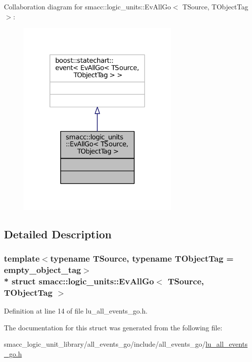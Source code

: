 Collaboration diagram for smacc\+:\+:logic\+\_\+units\+:\+:Ev\+All\+Go$<$ T\+Source, T\+Object\+Tag $>$\+:
\nopagebreak
\begin{figure}[H]
\begin{center}
\leavevmode
\includegraphics[width=224pt]{structsmacc_1_1logic__units_1_1EvAllGo__coll__graph}
\end{center}
\end{figure}


\subsection{Detailed Description}
\subsubsection*{template$<$typename T\+Source, typename T\+Object\+Tag = empty\+\_\+object\+\_\+tag$>$\\*
struct smacc\+::logic\+\_\+units\+::\+Ev\+All\+Go$<$ T\+Source, T\+Object\+Tag $>$}



Definition at line 14 of file lu\+\_\+all\+\_\+events\+\_\+go.\+h.



The documentation for this struct was generated from the following file\+:\begin{DoxyCompactItemize}
\item 
smacc\+\_\+logic\+\_\+unit\+\_\+library/all\+\_\+events\+\_\+go/include/all\+\_\+events\+\_\+go/\hyperlink{lu__all__events__go_8h}{lu\+\_\+all\+\_\+events\+\_\+go.\+h}\end{DoxyCompactItemize}
